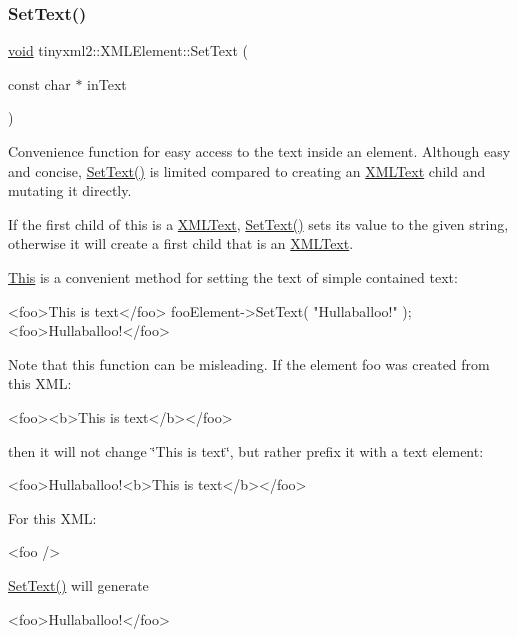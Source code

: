 \subsubsection{\texorpdfstring{Set\+Text()}{SetText()}}
{\footnotesize\ttfamily \hyperlink{interfacevoid}{void} tinyxml2\+::\+X\+M\+L\+Element\+::\+Set\+Text (\begin{DoxyParamCaption}\item[{const char $\ast$}]{in\+Text }\end{DoxyParamCaption})}

Convenience function for easy access to the text inside an element. Although easy and concise, \hyperlink{classtinyxml2_1_1_x_m_l_element_a1f9c2cd61b72af5ae708d37b7ad283ce}{Set\+Text()} is limited compared to creating an \hyperlink{classtinyxml2_1_1_x_m_l_text}{X\+M\+L\+Text} child and mutating it directly.

If the first child of \textquotesingle{}this\textquotesingle{} is a \hyperlink{classtinyxml2_1_1_x_m_l_text}{X\+M\+L\+Text}, \hyperlink{classtinyxml2_1_1_x_m_l_element_a1f9c2cd61b72af5ae708d37b7ad283ce}{Set\+Text()} sets its value to the given string, otherwise it will create a first child that is an \hyperlink{classtinyxml2_1_1_x_m_l_text}{X\+M\+L\+Text}.

\hyperlink{namespace_this}{This} is a convenient method for setting the text of simple contained text\+: \begin{DoxyVerb}<foo>This is text</foo>
    fooElement->SetText( "Hullaballoo!" );
<foo>Hullaballoo!</foo>
\end{DoxyVerb}


Note that this function can be misleading. If the element foo was created from this X\+ML\+: \begin{DoxyVerb}    <foo><b>This is text</b></foo>
\end{DoxyVerb}


then it will not change \char`\"{}\+This is text\char`\"{}, but rather prefix it with a text element\+: \begin{DoxyVerb}    <foo>Hullaballoo!<b>This is text</b></foo>
\end{DoxyVerb}


For this X\+ML\+: \begin{DoxyVerb}    <foo />
\end{DoxyVerb}
 \hyperlink{classtinyxml2_1_1_x_m_l_element_a1f9c2cd61b72af5ae708d37b7ad283ce}{Set\+Text()} will generate \begin{DoxyVerb}    <foo>Hullaballoo!</foo>
\end{DoxyVerb}
 \mbox{\label{classtinyxml2_1_1_x_m_l_element_aafa2807a45b28fe096b29d76e6a13b7c}} 
